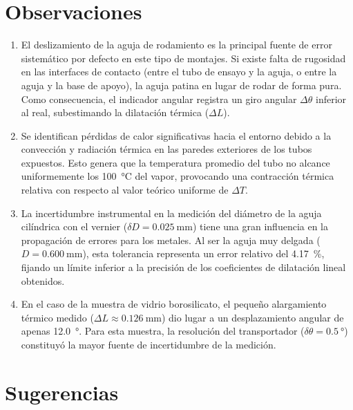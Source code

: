 
\section{Observaciones}

\begin{enumerate}
    \item El deslizamiento de la aguja de rodamiento es la principal fuente de error sistemático por defecto en este tipo de montajes. Si existe falta de rugosidad en las interfaces de contacto (entre el tubo de ensayo y la aguja, o entre la aguja y la base de apoyo), la aguja patina en lugar de rodar de forma pura. Como consecuencia, el indicador angular registra un giro angular $\Delta\theta$ inferior al real, subestimando la dilatación térmica ($\Delta L$).
    \item Se identifican pérdidas de calor significativas hacia el entorno debido a la convección y radiación térmica en las paredes exteriores de los tubos expuestos. Esto genera que la temperatura promedio del tubo no alcance uniformemente los \qty{100}{\celsius} del vapor, provocando una contracción térmica relativa con respecto al valor teórico uniforme de $\Delta T$.
    \item La incertidumbre instrumental en la medición del diámetro de la aguja cilíndrica con el vernier ($\delta D = \qty{0,025}{\milli\meter}$) tiene una gran influencia en la propagación de errores para los metales. Al ser la aguja muy delgada ($D = \qty{0,600}{\milli\meter}$), esta tolerancia representa un error relativo del \qty{4,17}{\percent}, fijando un límite inferior a la precisión de los coeficientes de dilatación lineal obtenidos.
    \item En el caso de la muestra de vidrio borosilicato, el pequeño alargamiento térmico medido ($\Delta L \approx \qty{0,126}{\milli\meter}$) dio lugar a un desplazamiento angular de apenas \qty{12.0}{\degree}. Para esta muestra, la resolución del transportador ($\delta\theta = \qty{0.5}{\degree}$) constituyó la mayor fuente de incertidumbre de la medición.
\end{enumerate}

\section{Sugerencias}

